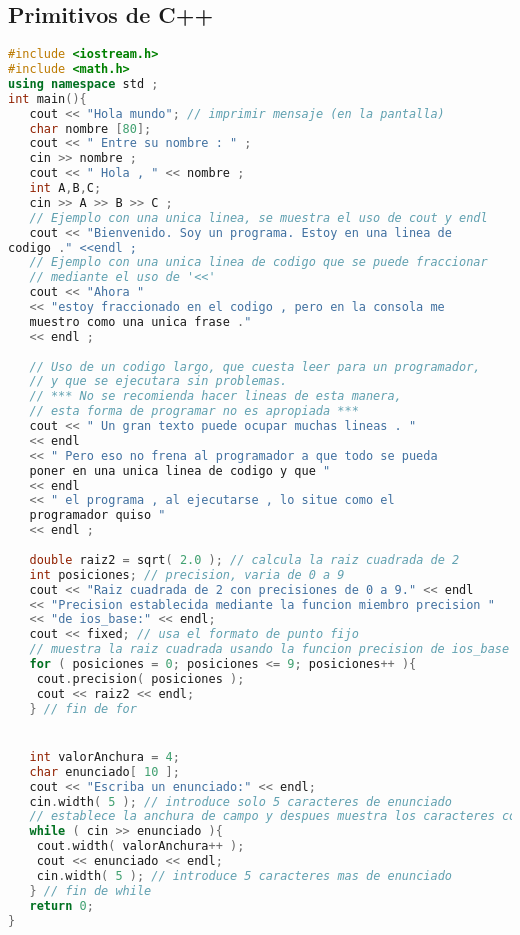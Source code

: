 \subsection{Primitivos de C++}
\begin{lstlisting}[language=C++]
#include <iostream.h>
#include <math.h>
using namespace std ;
int main(){
   cout << "Hola mundo"; // imprimir mensaje (en la pantalla)
   char nombre [80];
   cout << " Entre su nombre : " ;
   cin >> nombre ;
   cout << " Hola , " << nombre ;
   int A,B,C;
   cin >> A >> B >> C ;
   // Ejemplo con una unica linea, se muestra el uso de cout y endl
   cout << "Bienvenido. Soy un programa. Estoy en una linea de
codigo ." <<endl ;
   // Ejemplo con una unica linea de codigo que se puede fraccionar
   // mediante el uso de '<<'
   cout << "Ahora "
   << "estoy fraccionado en el codigo , pero en la consola me
   muestro como una unica frase ."
   << endl ;
   
   // Uso de un codigo largo, que cuesta leer para un programador,
   // y que se ejecutara sin problemas.
   // *** No se recomienda hacer lineas de esta manera,
   // esta forma de programar no es apropiada ***
   cout << " Un gran texto puede ocupar muchas lineas . "
   << endl
   << " Pero eso no frena al programador a que todo se pueda
   poner en una unica linea de codigo y que "
   << endl
   << " el programa , al ejecutarse , lo situe como el
   programador quiso "
   << endl ;
   
   double raiz2 = sqrt( 2.0 ); // calcula la raiz cuadrada de 2
   int posiciones; // precision, varia de 0 a 9
   cout << "Raiz cuadrada de 2 con precisiones de 0 a 9." << endl
   << "Precision establecida mediante la funcion miembro precision "
   << "de ios_base:" << endl;
   cout << fixed; // usa el formato de punto fijo
   // muestra la raiz cuadrada usando la funcion precision de ios_base
   for ( posiciones = 0; posiciones <= 9; posiciones++ ){
   	cout.precision( posiciones );
   	cout << raiz2 << endl;
   } // fin de for


   int valorAnchura = 4;
   char enunciado[ 10 ];
   cout << "Escriba un enunciado:" << endl;
   cin.width( 5 ); // introduce solo 5 caracteres de enunciado
   // establece la anchura de campo y despues muestra los caracteres con base en esa anchura
   while ( cin >> enunciado ){
   	cout.width( valorAnchura++ );
   	cout << enunciado << endl;
   	cin.width( 5 ); // introduce 5 caracteres mas de enunciado
   } // fin de while
   return 0;
}	
\end{lstlisting}


